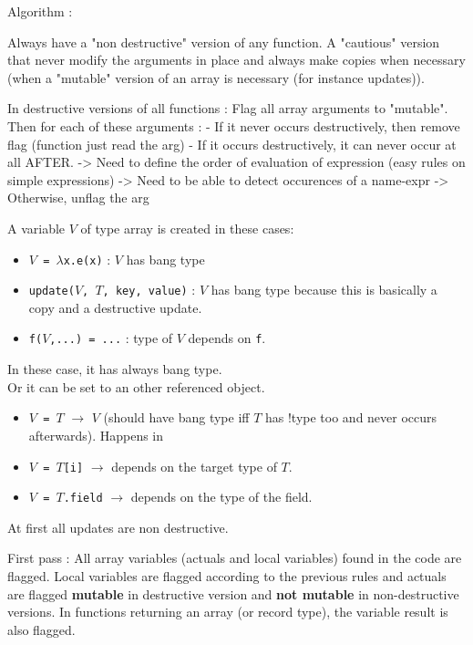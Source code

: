 \documentclass[12pt,a4paper,titlepage]{article}
\newcommand{\cl}[1]{\texttt{#1}}
\begin{document}
Algorithm :

Always have a "non destructive" version of any function. A "cautious" version that never modify the arguments in place and always make copies when necessary (when a "mutable" version of an array is necessary (for instance updates)).

In destructive versions of all functions :
Flag all array arguments to "mutable".
Then for each of these arguments :
  - If it never occurs destructively, then remove flag
          (function just read the arg)
  - If it occurs destructively, it can never occur at all AFTER.
  -> Need to define the order of evaluation of expression
      (easy rules on simple expressions)
  -> Need to be able to detect occurences of a name-expr
  -> Otherwise, unflag the arg

A variable $V$ of type array is created in these cases:
\begin{itemize}
\item \cl{$V$ = $\lambda$x.e(x)} : $V$ has bang type
\item \cl{update($V$, $T$, key, value)} : $V$ has bang type because this is basically a copy and a destructive update.
\item \cl{f($V$,...) = ...} : type of $V$ depends on \cl{f}.
\end{itemize}
In these case, it has always bang type.\\
Or it can be set to an other referenced object.
\begin{itemize}
\item \cl{$V$ = $T$} $\rightarrow$ $V$ (should have bang type iff $T$ has !type too and never occurs afterwards). Happens in 
\item \cl{$V$ = $T$[i]} $\rightarrow$ depends on the target type of $T$.
\item \cl{$V$ = $T$.field} $\rightarrow$ depends on the type of the field.
\end{itemize}
At first all updates are non destructive.

First pass : All array variables (actuals and local variables) found in the code are flagged. Local variables are flagged according to the previous rules and actuals are flagged \textbf{mutable} in destructive version and \textbf{not mutable} in non-destructive versions. In functions returning an array (or record type), the variable result is also flagged.\\
\end{document}
